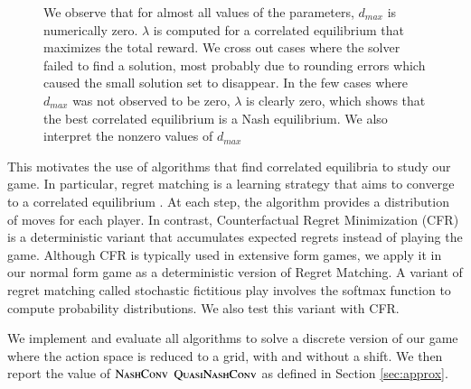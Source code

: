 \documentclass[preprint,12pt,authoryear,doubleblind]{elsarticle}
\theoremstyle{definition}
\begin{document}
\begin{figure}[htbp]
  \centering
  \begin{minipage}[t]{0.48\textwidth}
    \centering
    
  \end{minipage}
  \hfill
  \begin{minipage}[t]{0.48\textwidth}
    \centering
    
  \end{minipage}
  \caption{We observe that for almost all values of the parameters, $d_{max}$ is numerically zero. $\lambda$ is computed for a correlated equilibrium that maximizes the total reward. We cross out cases where the solver failed to find a solution, most probably due to rounding errors which caused the small solution set to disappear. In the few cases where $d_{max}$ was not observed to be zero, $\lambda$ is clearly zero, which shows that the best correlated equilibrium is a Nash equilibrium. We also interpret the nonzero values of $d_{max}$}
  \label{fig:linear-shift}  
\end{figure}

This motivates the use of algorithms that find correlated equilibria to study our game. In particular, regret matching is a learning strategy that aims to converge to a correlated equilibrium \citep{Hart1997-nk}. At each step, the algorithm provides a distribution of moves for each player. In contrast, Counterfactual Regret Minimization (CFR) \citep{neller2013introduction} is a deterministic variant that accumulates expected regrets instead of playing the game. Although CFR is typically used in extensive form games, we apply it in our normal form game as a deterministic version of Regret Matching.
A variant of regret matching called stochastic fictitious play \citep{fudenberg1993learning} involves the softmax function to compute probability distributions. We also test this variant with CFR.

We implement and evaluate all algorithms to solve a discrete version of our game where the action space is reduced to a grid, with and without a shift. We then report the value of $\textsc{NashConv}$ $\textsc{QuasiNashConv}$ as defined in Section \ref{sec:approx}.
\end{document}

